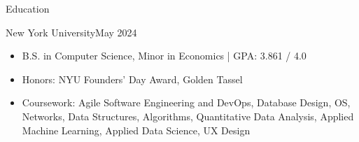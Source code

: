 \documentclass[]{mcdowellcv}
\begin{document}
	\makeheader
	
	\vspace{-0.1cm}
	
	\begin{cvsection}{Education}
		\begin{cvsubsection}{}{New York University}{May 2024}
			\begin{itemize}
				\item B.S. in Computer Science, Minor in Economics | GPA: 3.861 / 4.0
				\item Honors: NYU Founders' Day Award, Golden Tassel
				\item Coursework: Agile Software Engineering and DevOps, Database Design, OS, Networks, Data Structures, Algorithms, Quantitative Data Analysis, Applied Machine Learning, Applied Data Science, UX Design
			\end{itemize}
		\end{cvsubsection}
	\end{cvsection}
	
	\vspace{-0.25cm}
	
\end{document}
